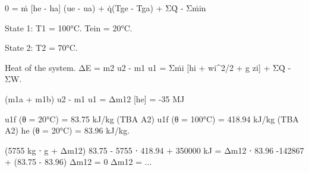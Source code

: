 0 = ṁ [he - ha] (ue - ua) + q̇(Tge - Tga) + ΣQ̇ - Σṁin  

State 1:  
T1 = 100°C.  
Tein = 20°C.  

State 2:  
T2 = 70°C.  

Heat of the system.  
ΔE = m2 u2 - m1 u1 = Σṁi [hi + wi^2/2 + g zi] + ΣQ̇ - ΣW.  

(m1a + m1b) u2 - m1 u1 = Δm12 [he] = -35 MJ  

u1f (θ = 20°C) = 83.75 kJ/kg (TBA A2)  
u1f (θ = 100°C) = 418.94 kJ/kg (TBA A2)  
he (θ = 20°C) = 83.96 kJ/kg.  

(5755 kg ⋅ g + Δm12) 83.75 - 5755 ⋅ 418.94 + 350000 kJ = Δm12 ⋅ 83.96  
-142867 + (83.75 - 83.96) Δm12 = 0  
Δm12 = ...